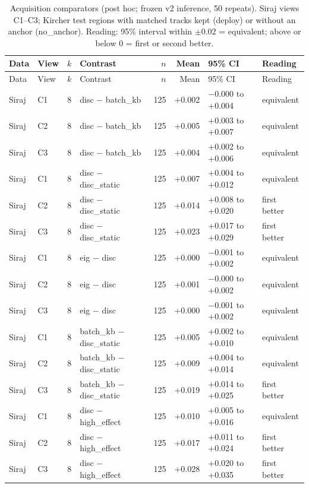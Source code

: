 {\small\begin{longtable}{llrlrrll}
\caption{Acquisition comparators (post hoc; frozen v2 inference, 50 repeats). Siraj views C1--C3; Kircher test regions with matched tracks kept (deploy) or without an anchor (no\_anchor). Reading: 95\% interval within $\pm0.02$ = equivalent; above or below 0 = first or second better.}\label{tab:s4}\\
\toprule
Data & View & $k$ & Contrast & $n$ & Mean & 95\% CI & Reading \\
\midrule
\endfirsthead
\toprule
Data & View & $k$ & Contrast & $n$ & Mean & 95\% CI & Reading \\
\midrule
\endhead
Siraj & C1 & 8 & disc $-$ batch\_kb & 125 & +0.002 & $-$0.000 to +0.004 & equivalent  \\
Siraj & C2 & 8 & disc $-$ batch\_kb & 125 & +0.005 & +0.003 to +0.007 & equivalent  \\
Siraj & C3 & 8 & disc $-$ batch\_kb & 125 & +0.004 & +0.002 to +0.006 & equivalent  \\
Siraj & C1 & 8 & disc $-$ disc\_static & 125 & +0.007 & +0.004 to +0.012 & equivalent  \\
Siraj & C2 & 8 & disc $-$ disc\_static & 125 & +0.014 & +0.008 to +0.020 & first better \\
Siraj & C3 & 8 & disc $-$ disc\_static & 125 & +0.023 & +0.017 to +0.029 & first better \\
Siraj & C1 & 8 & eig $-$ disc & 125 & +0.000 & $-$0.001 to +0.002 & equivalent  \\
Siraj & C2 & 8 & eig $-$ disc & 125 & +0.001 & $-$0.000 to +0.002 & equivalent  \\
Siraj & C3 & 8 & eig $-$ disc & 125 & +0.000 & $-$0.001 to +0.002 & equivalent  \\
Siraj & C1 & 8 & batch\_kb $-$ disc\_static & 125 & +0.005 & +0.002 to +0.010 & equivalent  \\
Siraj & C2 & 8 & batch\_kb $-$ disc\_static & 125 & +0.009 & +0.004 to +0.014 & equivalent  \\
Siraj & C3 & 8 & batch\_kb $-$ disc\_static & 125 & +0.019 & +0.014 to +0.025 & first better \\
Siraj & C1 & 8 & disc $-$ high\_effect & 125 & +0.010 & +0.005 to +0.016 & equivalent  \\
Siraj & C2 & 8 & disc $-$ high\_effect & 125 & +0.017 & +0.011 to +0.024 & first better \\
Siraj & C3 & 8 & disc $-$ high\_effect & 125 & +0.028 & +0.020 to +0.035 & first better \\

\end{longtable}}
